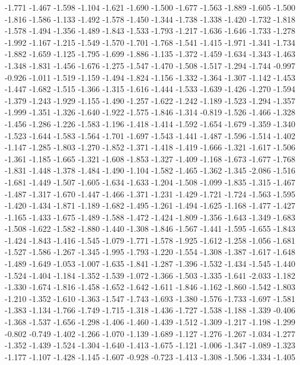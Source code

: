 \documentclass[9pt]{article}
\theoremstyle{plain}
\theoremstyle{definition}
\theoremstyle{remark}
\numberwithin{equation}{section}
\begin{document}
-1.771
-1.467
-1.598
-1.104
-1.621
-1.690
-1.500
-1.677
-1.563
-1.889
-1.605
-1.500
-1.816
-1.586
-1.133
-1.492
-1.578
-1.450
-1.344
-1.738
-1.338
-1.420
-1.732
-1.818
-1.578
-1.494
-1.356
-1.489
-1.843
-1.533
-1.793
-1.217
-1.636
-1.646
-1.733
-1.278
-1.992
-1.167
-1.215
-1.549
-1.570
-1.701
-1.768
-1.541
-1.415
-1.971
-1.341
-1.734
-1.882
-1.659
-1.125
-1.795
-1.699
-1.886
-1.135
-1.372
-1.459
-1.634
-1.343
-1.463
-1.348
-1.831
-1.456
-1.676
-1.275
-1.547
-1.470
-1.508
-1.517
-1.294
-1.744
-0.997
-0.926
-1.011
-1.519
-1.159
-1.494
-1.824
-1.156
-1.332
-1.364
-1.307
-1.142
-1.453
-1.447
-1.682
-1.515
-1.366
-1.315
-1.616
-1.444
-1.533
-1.639
-1.426
-1.270
-1.594
-1.379
-1.243
-1.929
-1.155
-1.490
-1.257
-1.622
-1.242
-1.189
-1.523
-1.294
-1.357
-1.999
-1.351
-1.326
-1.640
-1.922
-1.575
-1.846
-1.314
-0.819
-1.526
-1.466
-1.328
-1.456
-1.286
-1.226
-1.583
-1.196
-1.418
-1.414
-1.592
-1.654
-1.679
-1.359
-1.340
-1.523
-1.644
-1.583
-1.564
-1.701
-1.697
-1.543
-1.441
-1.487
-1.596
-1.514
-1.402
-1.147
-1.285
-1.803
-1.270
-1.852
-1.371
-1.418
-1.419
-1.666
-1.321
-1.617
-1.506
-1.361
-1.185
-1.665
-1.321
-1.608
-1.853
-1.327
-1.409
-1.168
-1.673
-1.677
-1.768
-1.831
-1.448
-1.378
-1.484
-1.490
-1.104
-1.582
-1.465
-1.362
-1.345
-2.086
-1.516
-1.681
-1.449
-1.507
-1.605
-1.634
-1.633
-1.204
-1.508
-1.099
-1.835
-1.315
-1.467
-1.487
-1.317
-1.670
-1.447
-1.466
-1.371
-1.231
-1.429
-1.721
-1.724
-1.563
-1.595
-1.420
-1.434
-1.871
-1.189
-1.682
-1.495
-1.261
-1.494
-1.625
-1.168
-1.477
-1.427
-1.165
-1.433
-1.675
-1.489
-1.588
-1.472
-1.424
-1.809
-1.356
-1.643
-1.349
-1.683
-1.508
-1.622
-1.582
-1.880
-1.440
-1.308
-1.846
-1.567
-1.441
-1.595
-1.655
-1.843
-1.424
-1.843
-1.416
-1.545
-1.079
-1.771
-1.578
-1.925
-1.612
-1.258
-1.056
-1.681
-1.527
-1.586
-1.267
-1.345
-1.995
-1.793
-1.220
-1.554
-1.308
-1.387
-1.617
-1.648
-1.489
-1.649
-1.053
-1.007
-1.635
-1.841
-1.287
-1.396
-1.532
-1.434
-1.545
-1.440
-1.524
-1.404
-1.184
-1.352
-1.539
-1.072
-1.366
-1.503
-1.335
-1.641
-2.033
-1.182
-1.330
-1.674
-1.816
-1.458
-1.652
-1.642
-1.611
-1.846
-1.162
-1.860
-1.542
-1.803
-1.210
-1.352
-1.610
-1.363
-1.547
-1.743
-1.693
-1.380
-1.576
-1.733
-1.697
-1.581
-1.383
-1.134
-1.766
-1.749
-1.715
-1.318
-1.436
-1.727
-1.538
-1.188
-1.339
-0.406
-1.368
-1.537
-1.656
-1.298
-1.406
-1.460
-1.439
-1.512
-1.309
-1.217
-1.198
-1.299
-0.802
-0.749
-1.402
-1.266
-1.070
-1.139
-1.689
-1.127
-1.276
-1.267
-1.034
-1.277
-1.352
-1.439
-1.524
-1.304
-1.640
-1.413
-1.675
-1.121
-1.006
-1.347
-1.089
-1.323
-1.177
-1.107
-1.428
-1.145
-1.607
-0.928
-0.723
-1.413
-1.308
-1.506
-1.334
-1.405
\end{document}
